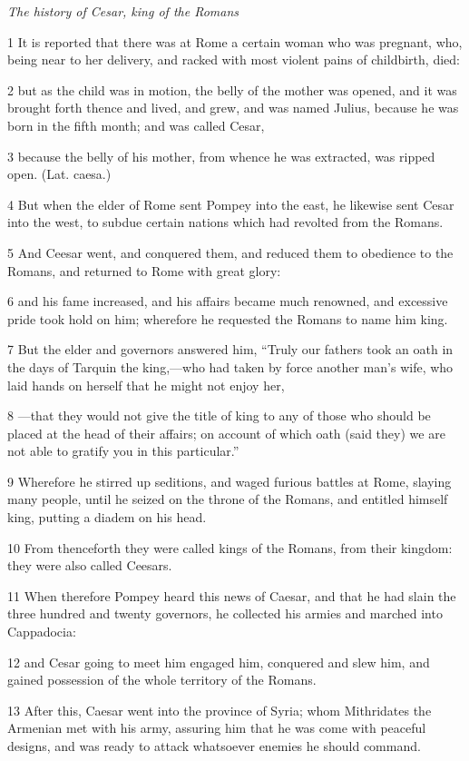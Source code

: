 \par \textit{The history of Cesar, king of the Romans}

1 It is reported that there was at Rome a certain woman who was pregnant, who, being near to her delivery, and racked with most violent pains of childbirth, died: 

2 but as the child was in motion, the belly of the mother was opened, and it was brought forth thence and lived, and grew, and was named Julius, because he was born in the fifth month; and was called Cesar, 

3 because the belly of his mother, from whence he was extracted, was ripped open. (Lat. caesa.) 

4 But when the elder of Rome sent Pompey into the east, he likewise sent Cesar into the west, to subdue certain nations which had revolted from the Romans. 

5 And Ceesar went, and conquered them, and reduced them to obedience to the Romans, and returned to Rome with great glory: 

6 and his fame increased, and his affairs became much renowned, and excessive pride took hold on him; wherefore he requested the Romans to name him king. 

7 But the elder and governors answered him, “Truly our fathers took an oath in the days of Tarquin the king,—who had taken by force another man’s wife, who laid hands on herself that he might not enjoy her,

8 —that they would not give the title of king to any of those who should be placed at the head of their affairs; on account of which oath (said they) we are not able to gratify you in this particular.” 

9 Wherefore he stirred up seditions, and waged furious battles at Rome, slaying many people, until he seized on the throne of the Romans, and entitled himself king, putting a diadem on his head. 

10 From thenceforth they were called kings of the Romans, from their kingdom: they were also called Ceesars.

11 When therefore Pompey heard this news of Caesar, and that he had slain the three hundred and twenty governors, he collected his armies and marched into Cappadocia: 

12 and Cesar going to meet him engaged him, conquered and slew him, and gained possession of the whole territory of the Romans. 

13 After this, Caesar went into the province of Syria; whom Mithridates the Armenian met with his army, assuring him that he was come with peaceful designs, and was ready to attack whatsoever enemies he should command. 

